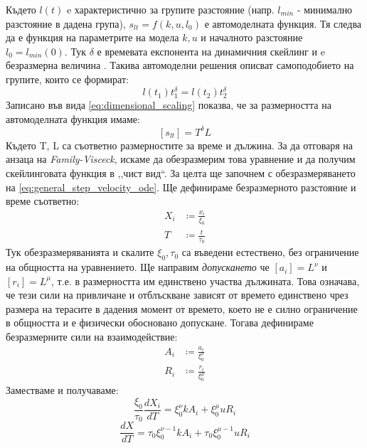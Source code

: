 Където $l(t)$ e характеристично за групите разстояние (напр. $l_{min}$ - минимално разстояние в дадена група),  $s_{l t} = f(k, u, l_0)$ е автомоделната функция. Тя следва да е функция на параметрите на модела $k, u$ и началното разстояние $l_0 = l_{min} (0)$. Тук $\delta$ е времевата експонента на динамичния скейлинг и e безразмерна величина \cite{Vicsek1984}. Такива автомоделни решения описват самоподобието на групите, които се формират:
\begin{equation*}
    l(t_1) t_1^\delta = l(t_2) t_2^\delta
\end{equation*}
Записано във вида \autoref{eq:dimensional_scaling} показва, че за размерността на автомоделната функция имаме:
\begin{equation*}
    \left[s_{l t} \right] = T^\delta L
\end{equation*}
Където T, L са съответно размерностите за време и дължина. За да отговаря на анзаца на \textit{Family-Visceck}, искаме да обезразмерим това уравнение и да получим скейлинговата функция в ,,чист вид``. За целта ще започнем с обезразмеряването на \autoref{eq:general_step_velocity_ode}.
Ще дефинираме безразмерното разстояние и време съответно:
\begin{align*}
    X_{i} & \coloneqq \frac{x_i}{\xi_0} \\
    T & \coloneqq \frac{t}{\tau_0}
\end{align*}
Тук обезразмеряванията и скалите $\xi_0, \tau_0$ са въведени естествено, без ограничение на общността на уравнението.
Ще направим \textit{допускането} че $[a_i] = L ^ \nu $ и $[r_i] = L ^ \mu$, т.е. в размерността им единствено участва дължината. Това означава, че тези сили на привличане и отблъскване зависят от времето единствено чрез размера на терасите в дадения момент от времето, което не е силно ограничение в общността и е физически обосновано допускане. Тогава дефинираме безразмерните сили на взаимодействие:
\begin{align*}
    A_{i} & \coloneqq \frac{a_i}{\xi_{0}^ \nu} \\
    R_{i} & \coloneqq \frac{r_i}{\xi_{0}^ \mu}
\end{align*}
Заместваме и получаваме:
\begin{equation*}
    \frac{\xi_0}{\tau_0} \frac{d X_i}{d T} = \xi_0^\nu k A_i + \xi_0^\mu u R_i
\end{equation*}
\begin{equation*}
    \frac{d X }{d T} = \tau_0 \xi_0^{\nu-1} k A_i + \tau_0 \xi_0^{\mu-1} u R_i
\end{equation*}
